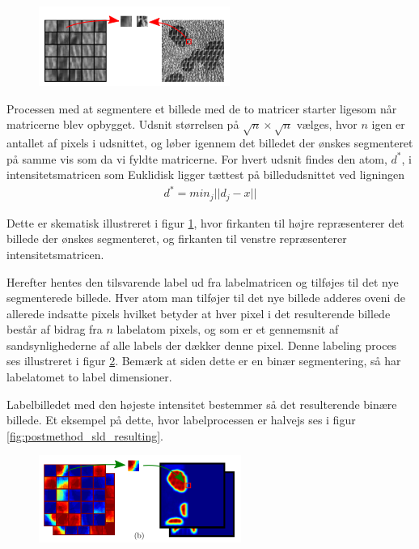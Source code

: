 \begin{figure}[H]
		\centering
		\includegraphics[scale=1]{files/postmethod/img/dict_3.png}
	\caption{\label{fig:postmethod_sld_imagepatch}}
\end{figure}

Processen med at segmentere et billede med de to matricer starter ligesom når matricerne blev opbygget. Udsnit størrelsen på $\sqrt{n}\times\sqrt{n}$ vælges, hvor $n$ igen er antallet af pixels i udsnittet, og løber igennem det billedet der ønskes segmenteret på samme vis som da vi fyldte matricerne. For hvert udsnit findes den atom, $d^*$, i intensitetsmatricen som Euklidisk ligger tættest på billedudsnittet ved ligningen
\begin{align}
	d^* = min_j ||d_j-x||
\end{align}

Dette er skematisk illustreret i figur \ref{fig:postmethod_sld_imagepatch}, hvor firkanten til højre repræsenterer det billede der ønskes segmenteret, og firkanten til venstre repræsenterer intensitetsmatricen. 

Herefter hentes den tilsvarende label ud fra labelmatricen og tilføjes til det nye segmenterede billede. Hver atom man tilføjer til det nye billede adderes oveni de allerede indsatte pixels hvilket betyder at hver pixel i det resulterende billede består af bidrag fra $n$ labelatom pixels, og som er et gennemsnit af sandsynlighederne af alle labels der dækker denne pixel. Denne labeling proces ses illustreret i figur \ref{fig:postmethod_sld_labelpatch}. Bemærk at siden dette er en binær segmentering, så har labelatomet to label dimensioner.  

Labelbilledet med den højeste intensitet bestemmer så det resulterende binære billede. Et eksempel på dette, hvor labelprocessen er halvejs ses i figur \ref{fig:postmethod_sld_resulting}.

\begin{figure}[H]
		\centering
		\includegraphics[scale=1]{files/postmethod/img/dict_4.png}
	\caption{\label{fig:postmethod_sld_labelpatch}}
\end{figure}

